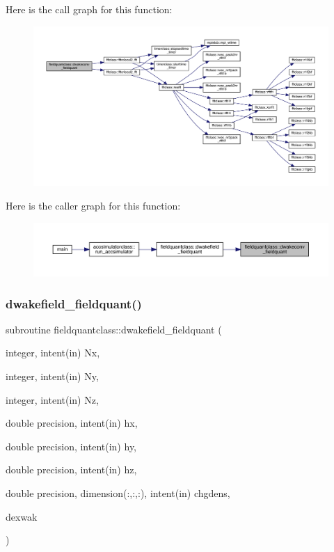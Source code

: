 Here is the call graph for this function\+:\nopagebreak
\begin{figure}[H]
\begin{center}
\leavevmode
\includegraphics[width=350pt]{namespacefieldquantclass_a80dd0228de4fecabda6f6696b098a11f_cgraph}
\end{center}
\end{figure}
Here is the caller graph for this function\+:\nopagebreak
\begin{figure}[H]
\begin{center}
\leavevmode
\includegraphics[width=350pt]{namespacefieldquantclass_a80dd0228de4fecabda6f6696b098a11f_icgraph}
\end{center}
\end{figure}
\mbox{\label{namespacefieldquantclass_a990a046cc996cb957a94c4995bfe803a}} 
\subsubsection{\texorpdfstring{dwakefield\_fieldquant()}{dwakefield\_fieldquant()}}
{\footnotesize\ttfamily subroutine fieldquantclass\+::dwakefield\+\_\+fieldquant (\begin{DoxyParamCaption}\item[{integer, intent(in)}]{Nx,  }\item[{integer, intent(in)}]{Ny,  }\item[{integer, intent(in)}]{Nz,  }\item[{double precision, intent(in)}]{hx,  }\item[{double precision, intent(in)}]{hy,  }\item[{double precision, intent(in)}]{hz,  }\item[{double precision, dimension(\+:,\+:,\+:), intent(in)}]{chgdens,  }\item[{}]{dexwak }\end{DoxyParamCaption})}



